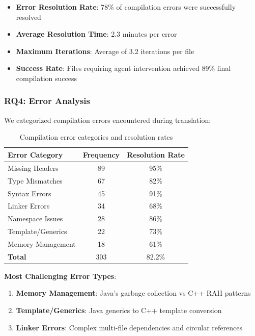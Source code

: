 \begin{itemize}
\item \textbf{Error Resolution Rate}: 78\% of compilation errors were successfully resolved
\item \textbf{Average Resolution Time}: 2.3 minutes per error
\item \textbf{Maximum Iterations}: Average of 3.2 iterations per file
\item \textbf{Success Rate}: Files requiring agent intervention achieved 89\% final compilation success
\end{itemize}

\subsubsection{RQ4: Error Analysis}

We categorized compilation errors encountered during translation:

\begin{table}[h]
\centering
\small
\begin{tabular}{lcc}
\toprule
\textbf{Error Category} & \textbf{Frequency} & \textbf{Resolution Rate} \\
\midrule
Missing Headers & 89 & 95\% \\
Type Mismatches & 67 & 82\% \\
Syntax Errors & 45 & 91\% \\
Linker Errors & 34 & 68\% \\
Namespace Issues & 28 & 86\% \\
Template/Generics & 22 & 73\% \\
Memory Management & 18 & 61\% \\
\midrule
\textbf{Total} & 303 & 82.2\% \\
\bottomrule
\end{tabular}
\caption{Compilation error categories and resolution rates}
\label{tab:error-analysis}
\end{table}

\textbf{Most Challenging Error Types}:
\begin{enumerate}
\item \textbf{Memory Management}: Java's garbage collection vs C++ RAII patterns
\item \textbf{Template/Generics}: Java generics to C++ template conversion
\item \textbf{Linker Errors}: Complex multi-file dependencies and circular references
\end{enumerate}

